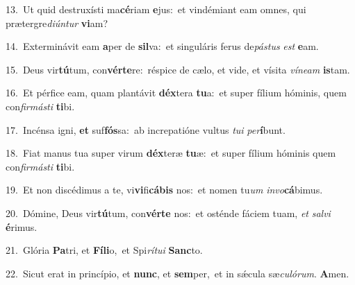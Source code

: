 {\numbfont\textcolor{\numbcolor}{13.}}~Ut quid destruxísti ma\-\textbf{cé}\-riam \textbf{e}\-jus:~\star et vindémiant eam omnes, qui prætergre\-\textit{di}\-\textit{ún}\textit{tur} \textbf{vi}\-am?\par
{\numbfont\textcolor{\numbcolor}{14.}}~Exterminávit eam \textbf{a}\-per de \textbf{sil}\-va:~\star et singuláris ferus de\-\textit{pás}\-\textit{tus} \textit{est} \textbf{e}\-am.\par
{\numbfont\textcolor{\numbcolor}{15.}}~Deus vir\-\textbf{tú}\-tum, con\-\textbf{vér}\-\textbf{te}re:~\star réspice de cælo, et vide, et vísita \textit{ví}\-\textit{ne}\textit{am} \textbf{is}\-tam.\par
{\numbfont\textcolor{\numbcolor}{16.}}~Et pérfice eam, quam plantávit \textbf{déx}\-tera \textbf{tu}\-a:~\star et super fílium hóminis, quem con\-\textit{fir}\-\textit{más}\textit{ti} \textbf{ti}\-bi.\par
{\numbfont\textcolor{\numbcolor}{17.}}~Incénsa igni, \textbf{et} suf\-\textbf{fós}\-sa:~\star ab increpatióne vultus \textit{tu}\-\textit{i} \textit{per}\-\textbf{í}bunt.\par
{\numbfont\textcolor{\numbcolor}{18.}}~Fiat manus tua super virum \textbf{déx}\-teræ \textbf{tu}\-æ:~\star et super fílium hóminis quem con\-\textit{fir}\-\textit{más}\textit{ti} \textbf{ti}\-bi.\par
{\numbfont\textcolor{\numbcolor}{19.}}~Et non discédimus a te, vi\-\textbf{vi}\-fi\-\textbf{cá}\-\textbf{bis} nos:~\star et nomen tu\textit{um} \textit{in}\-\textit{vo}\textbf{cá}bimus.\par
{\numbfont\textcolor{\numbcolor}{20.}}~Dómine, Deus vir\-\textbf{tú}\-tum, con\-\textbf{vér}\-\textbf{te} nos:~\star et osténde fáciem tuam, \textit{et} \textit{sal}\-\textit{vi} \textbf{é}\-rimus.\par
{\numbfont\textcolor{\numbcolor}{21.}}~Glória \textbf{Pa}\-tri, et \textbf{Fí}\-\textbf{li}o,~\star et Spi\-\textit{rí}\-\textit{tu}\textit{i} \textbf{Sanc}\-to.\par
{\numbfont\textcolor{\numbcolor}{22.}}~Sicut erat in princípio, et \textbf{nunc}\-, et \textbf{sem}\-per,~\star et in sǽcula sæ\-\textit{cu}\-\textit{ló}\textit{rum}. \textbf{A}\-men.\par
